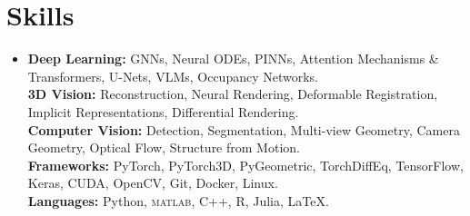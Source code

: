 \documentclass[letterpaper,10pt]{article}
\makeatletter
\newcommand{\resumeItem}[1]{\item\small{#1}}
\newcommand{\resumeSubheading}[4]{
  \vspace{-1pt}\item
    \begin{tabular*}{0.97\textwidth}[t]{l@{\extracolsep{\fill}}r}
      \textbf{#1} & #2 \\
      \textit{#3} & #4 \\
    \end{tabular*}\vspace{-3pt}
}
\newcommand{\resumeSubHeadingListStart}{\begin{itemize}[leftmargin=0.15in, label={}, itemsep=1pt, parsep=0pt]}
\newcommand{\resumeItemListStart}{\begin{itemize}[leftmargin=0.2in, itemsep=1pt, parsep=0pt]}
\newcommand{\resumeItemListEnd}{\end{itemize}\vspace{-2pt}}
\makeatother
\begin{document}
\section{Skills}
\begin{itemize}[leftmargin=0.15in, label={}, itemsep=1pt]
\small\item{
\textbf{Deep Learning:} GNNs, Neural ODEs, PINNs, Attention Mechanisms \& Transformers, U-Nets, VLMs, Occupancy Networks. \\
\textbf{3D Vision:} Reconstruction, Neural Rendering, Deformable Registration, Implicit Representations, Differential Rendering. \\
\textbf{Computer Vision:} Detection, Segmentation, Multi-view Geometry, Camera Geometry, Optical Flow, Structure from Motion. \\
\textbf{Frameworks:} PyTorch, PyTorch3D, PyGeometric, TorchDiffEq, TensorFlow, Keras, CUDA, OpenCV, Git, Docker, Linux. \\
\textbf{Languages:} Python, \textsc{matlab}, C++, R, Julia, \LaTeX.
}
\end{itemize}


\end{document}
